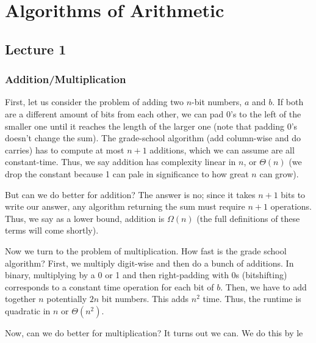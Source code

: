 \section{Algorithms of Arithmetic}

\subsection{Lecture 1}

\subsubsection{Addition/Multiplication}

First, let us consider the problem of adding two $n$-bit numbers, $a$ and $b$. If both are a different amount of bits from each other,
we can pad 0's to the left of the smaller one until it reaches the length of the larger one (note that padding 0's doesn't change the sum).
The grade-school algorithm (add column-wise and do carries)
has to compute at most $n + 1$ additions, which we can assume are all constant-time. Thus, we say addition has complexity linear in $n$,
or $\Theta(n)$ (we drop the constant because 1 can pale in significance to how great $n$ can grow).

But can we do better for addition? The answer is no; since it takes $n + 1$ bits to write our answer, any algorithm returning the sum
must require $n + 1$ operations. Thus, we say as a lower bound, addition is $\Omega(n)$ (the full definitions of these terms will come shortly).

Now we turn to the problem of multiplication. How fast is the grade school algorithm? First, we multiply digit-wise and then do a bunch of additions.
In binary, multiplying by a 0 or 1 and then right-padding with 0s (bitshifting) corresponds to a constant time operation for each bit of $b$.
Then, we have to add together $n$ potentially $2n$ bit numbers. This adds $n^2$ time. Thus, the runtime is quadratic in $n$
or $\Theta(n^2)$.

Now, can we do better for multiplication? It turns out we can. We do this by le